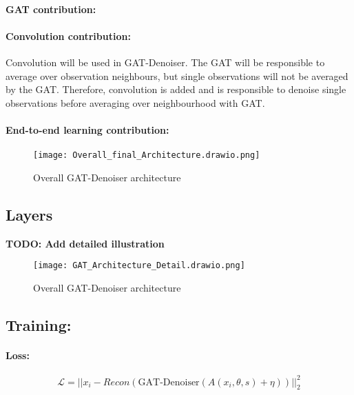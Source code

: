 \paragraph{GAT contribution:}

\paragraph{Convolution contribution:}


Convolution will be used in GAT-Denoiser. 
The GAT will be responsible to average over observation neighbours, but single observations will
not be averaged by the GAT. 
Therefore, convolution is added and is responsible to denoise single observations
before averaging over neighbourhood with GAT.

\paragraph{End-to-end learning contribution:}


\begin{figure}[h]
  \centering
  \label{fig:architecture-overall}
  \texttt{[image: Overall\_final\_Architecture.drawio.png]}
  \caption{Overall GAT-Denoiser architecture}
\end{figure}


\subsection{Layers}
\textbf{TODO: Add detailed illustration}

\begin{figure}[h]
  \centering
  \label{fig:architecture-detailed}
  \texttt{[image: GAT\_Architecture\_Detail.drawio.png]}
  \caption{Overall GAT-Denoiser architecture}
\end{figure}


\subsection{Training:}

\paragraph{Loss:}

\begin{equation}
  \mathcal{L} = || x_i - Recon ( \text{GAT-Denoiser}(A(x_i, \theta, s) + \eta)) ||^2_2
\end{equation}



